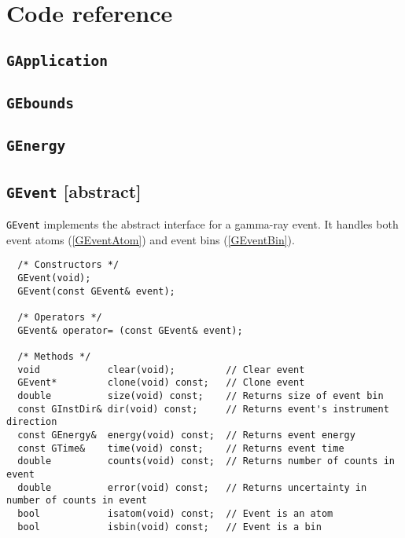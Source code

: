 \documentclass{article}[12pt,a4]
\begin{document}
\section{Code reference}

\subsection{{\tt GApplication}}

\subsection{{\tt GEbounds}}

\subsection{{\tt GEnergy}}

\subsection{{\tt GEvent} \small[abstract]}
{\tt GEvent} implements the abstract interface for a gamma-ray event.
It handles both event atoms (\ref{GEventAtom}) and event bins (\ref{GEventBin}).
\begin{verbatim}
  /* Constructors */
  GEvent(void);
  GEvent(const GEvent& event);

  /* Operators */
  GEvent& operator= (const GEvent& event);

  /* Methods */
  void            clear(void);         // Clear event
  GEvent*         clone(void) const;   // Clone event
  double          size(void) const;    // Returns size of event bin
  const GInstDir& dir(void) const;     // Returns event's instrument direction
  const GEnergy&  energy(void) const;  // Returns event energy
  const GTime&    time(void) const;    // Returns event time
  double          counts(void) const;  // Returns number of counts in event
  double          error(void) const;   // Returns uncertainty in number of counts in event
  bool            isatom(void) const;  // Event is an atom
  bool            isbin(void) const;   // Event is a bin
\end{verbatim}


\end{document}

